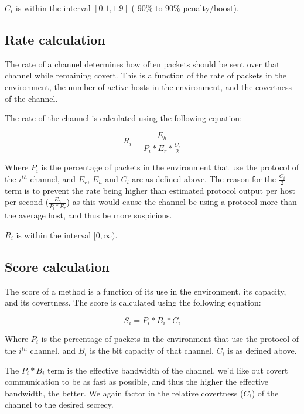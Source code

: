 $C_i$ is within the interval $[0.1, 1.9]$ (-90\% to 90\% penalty/boost).

\subsection{Rate calculation}

The rate of a channel determines how often packets should be sent over that channel while remaining covert. This is a function of the rate of packets in the environment, the number of active hosts in the environment, and the covertness of the channel.

The rate of the channel is calculated using the following equation:

\begin{equation}
    R_i = \frac{E_h}{P_i * E_r * \frac{C_i}{2} }
\end{equation}

Where $P_i$ is the percentage of packets in the environment that use the protocol of the $i^{th}$ channel, and $E_r$, $E_h$ and $C_i$ are as defined above. The reason for the $\frac{C_i}{2}$ term is to prevent the rate being higher than estimated protocol output per host per second ($\frac{E_h}{P_i * E_r}$) as this would cause the channel be using a protocol more than the average host, and thus be more suspicious.

$R_i$ is within the interval $[0, \infty)$.

\subsection{Score calculation}

The score of a method is a function of its use in the environment, its capacity, and its covertness.
The score is calculated using the following equation:

\begin{equation}
    S_i = P_i * B_i * C_i
\end{equation}

Where $P_i$ is the percentage of packets in the environment that use the protocol of the $i^{th}$ channel, and $B_i$ is the bit capacity of that channel. $C_i$ is as defined above.

The $P_i * B_i$ term is the effective bandwidth of the channel, we'd like out covert communication to be as fast as possible, and thus the higher the effective bandwidth, the better. We again factor in the relative covertness ($C_i$) of the channel to the desired secrecy.

